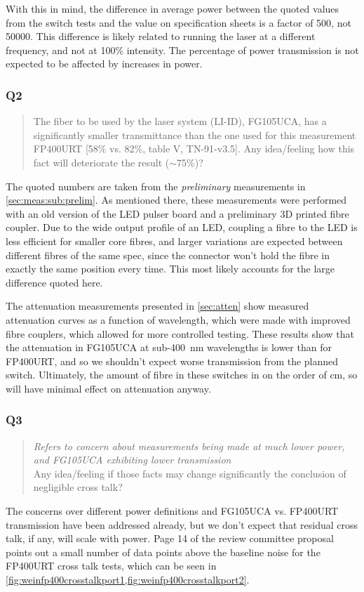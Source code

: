 \documentclass[a4paper,11pt]{article}
\let\oldsim\sim
\renewcommand{\sim}{{\oldsim}}
\begin{document}
With this in mind, the difference in average power between the quoted values from the switch tests and the value on specification sheets is a factor of 500, not 50000. This difference is likely related to running the laser at a different frequency, and not at 100\% intensity. The percentage of power transmission is not expected to be affected by increases in power.

\subsubsection{Q2}
\begin{quote}
The fiber to be used by the laser system (LI-ID), FG105UCA, has a significantly smaller transmittance than the one used for this measurement FP400URT [58\% vs. 82\%, table V, TN-91-v3.5]. Any idea/feeling how this fact will deteriorate the result ($\sim$75\%)?
\end{quote}

The quoted numbers are taken from the {\it preliminary} measurements in \cref{sec:meas:sub:prelim}. As mentioned there, these measurements were performed with an old version of the LED pulser board and a preliminary 3D printed fibre coupler. Due to the wide output profile of an LED, coupling a fibre to the LED is less efficient for smaller core fibres, and larger variations are expected between different fibres of the same spec, since the connector won't hold the fibre in exactly the same position every time. This most likely accounts for the large difference quoted here.

The attenuation measurements presented in \cref{sec:atten} show measured attenuation curves as a function of wavelength, which were made with improved fibre couplers, which allowed for more controlled testing. These results show that the attenuation in FG105UCA at sub-400~nm wavelengths is lower than for FP400URT, and so we shouldn't expect worse transmission from the planned switch. Ultimately, the amount of fibre in these switches in on the order of cm, so will have minimal effect on attenuation anyway.

\subsubsection{Q3}
\begin{quote}
    {\it Refers to concern about measurements being made at much lower power, and FG105UCA exhibiting lower transmission}\\
    Any idea/feeling if those facts may change significantly the conclusion of negligible cross talk?
\end{quote}
The concerns over different power definitions and FG105UCA vs. FP400URT transmission have been addressed already, but we don't expect that residual cross talk, if any, will scale with power. Page 14 of the review committee proposal points out a small number of data points above the baseline noise for the FP400URT cross talk tests, which can be seen in \cref{fig:weinfp400crosstalkport1,fig:weinfp400crosstalkport2}.
\end{document}
